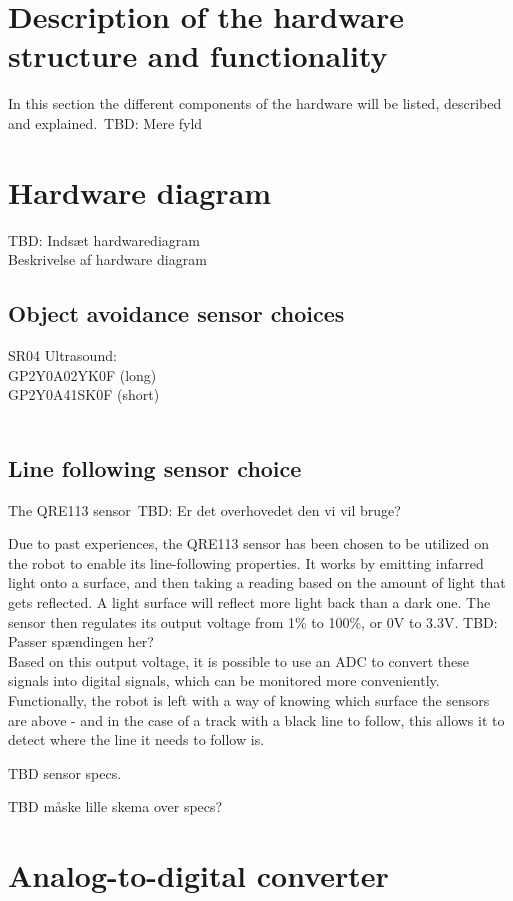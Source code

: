 \section{Description of the hardware structure and functionality}

In this section the different components of the hardware will be listed, described and explained.\
TBD: Mere fyld

\section{Hardware diagram}
TBD: Indsæt hardwarediagram\\
Beskrivelse af hardware diagram


\subsection{Object avoidance sensor choices}
SR04 Ultrasound:\\
GP2Y0A02YK0F (long) \\	
GP2Y0A41SK0F (short) \\
\\
\subsection{Line following sensor choice} 

The QRE113 sensor\
TBD: Er det overhovedet den vi vil bruge?\

Due to past experiences, the QRE113 sensor has been chosen to be utilized on the robot to enable its line-following properties. It works by emitting infarred light onto a surface, and then taking a reading based on the amount of light that gets reflected. A light surface will reflect more light back than a dark one. The sensor then regulates its output voltage from 1\% to 100\%, or 0V to 3.3V. TBD: Passer spændingen her?\\ Based on this output voltage, it is possible to use an ADC to convert these signals into digital signals, which can be monitored more conveniently. Functionally, the robot is left with a way of knowing which surface the sensors are above - and in the case of a track with a black line to follow, this allows it to detect where the line it needs to follow is.\

TBD sensor specs.\

TBD måske lille skema over specs?

\section{Analog-to-digital converter}


